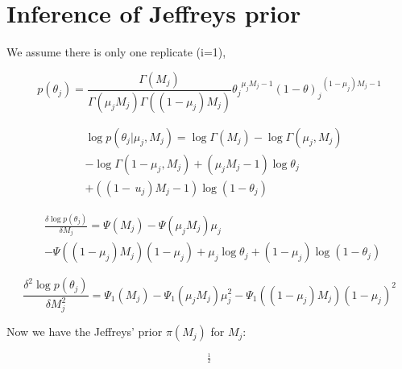 \documentclass[11pt,reqno]{amsart}
\begin{document}
\section{Inference of Jeffreys prior}\label{sec:appendix_Jeffreys}
We assume there is only one replicate (i=1),

\begin{equation}\label{eqn:Betapdf}
p\left({\theta }_{j} \right)= \frac{\Gamma \left({M}_{j} \right)}{\Gamma \left({\mu }_{j} {M}_{j}\right)\Gamma \left(( 1-{\mu }_{j}){M}_{j}\right)} {{\theta}_{j}}^{{\mu}_{j}{M}_{j}-1}{\left(1-\theta\right)_{j}}^{\left(1-{\mu}_{j}\right){M}_{j}-1}
\end{equation}

\begin{equation}\label{equ:JefferyInference1}
\begin{split}
&\log p\left(\theta_{j}|\mu_{j},M_{j}\right) =\log \Gamma \left(M_{j}\right)-\log \Gamma\left(\mu_{j},M_{j}\right)\\
&- \log \Gamma\left(1-\mu_{j},M_{j}\right) + (\mu_{j}M_{j}-1)\log\theta_{j}\\
& + ((1-\,u_{j})M_{j}-1)\log(1-\theta_{j})\
\end{split}
\end{equation}

\begin{equation}
\begin{split}
&\frac{\delta\log p(\theta_{j})}{\delta M_{j}} =\Psi(M_{j}) - \Psi(\mu_{j} M_{j})\mu_{j}\\
&- \Psi((1-\mu_{j})M_{j})(1-\mu_{j}) +\mu_{j}\log\theta_{j} + (1-\mu_{j})\log(1-\theta_{j})\
\end{split}
\end{equation}

\begin{equation}
\frac{\delta^{2}\log p(\theta_{j})}{\delta M_{j}^{2}}  = \Psi_{1}(M_{j}) - \Psi_{1}(\mu_{j} M_{j})\mu_{j}^{2} - \Psi_{1}((1-\mu_{j})M_{j})(1-\mu_{j})^{2}
\end{equation}

Now we have the Jeffreys' prior $\pi\left({M}_{j}\right)$ for $M_{j}$:

\begin{equation}
[-\left(\Psi_{1}(M_{j}) - \Psi_{1}(\mu_{j} M_{j})\mu_{j}^{2} - \Psi_{1}((1-\mu_{j})M_{j}){(1-\mu_{j})^{2}}\right)]^{\frac{1}{2}}
\end{equation}
\end{document}
